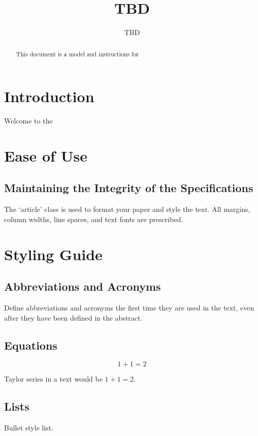 \documentclass{article}
\begin{document}
\title{TBD}

\author{TBD}

\maketitle

\begin{abstract}
This document is a model and instructions for 
\end{abstract}

\section{Introduction}
Welcome to the 

\section{Ease of Use}

\subsection{Maintaining the Integrity of the Specifications}
The `article' class is used to format your paper and style the text. All margins, column widths, line spaces, and text fonts are prescribed.

\section{Styling Guide}

\subsection{Abbreviations and Acronyms}
Define abbreviations and acronyms the first time they are used in the text, 
even after they have been defined in the abstract.

\subsection{Equations}
\begin{equation}
1+1=2
\end{equation}

Taylor series in a text would be $1+1=2$.

\subsection{Lists}
Bullet style list.
\end{document}
